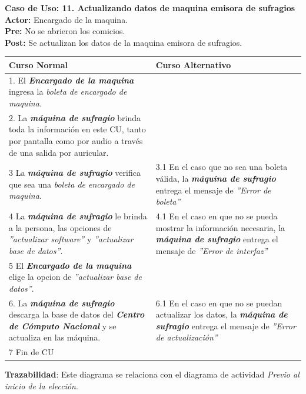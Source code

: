 \documentclass[spanish, 10pt,a4paper]{article}
\numberwithin{equation}{section} %
\begin{document}
\clearpage
\noindent\textbf{Caso de Uso: 11. Actualizando datos de maquina emisora de sufragios}\\
\textbf{Actor: } Encargado de la maquina.\\
\textbf{Pre: } No se abrieron los comicios.\\
\textbf{Post: } Se actualizan los datos de la maquina emisora de sufragios.\\
\begin{table}[H]
  \centering
\bgroup
\def\arraystretch{1.3}
  \begin{tabular}{p{9cm} | p{7cm}}
    \hline
    Curso Normal & Curso Alternativo \\
    \hline
    \hline    
    1. El \textbf{\textit{Encargado de la maquina}} ingresa la \textit{boleta de encargado de maquina}. 
    & \\
    
    \hline
    2. La \textbf{\textit{máquina de sufragio}} brinda toda la información en este CU, tanto por pantalla como por audio a través de una salida por auricular.
    &
    \\
    
    \hline
    3 La \textbf{\textit{máquina de sufragio}} verifica que sea una \textit{boleta de encargado de maquina}.
    & 
    3.1 En el caso que no sea una boleta válida, la \textbf{\textit{máquina de sufragio}} entrega el mensaje de \textit{''Error de boleta''}
    \\
    
    \hline
    4 La \textbf{\textit{máquina de sufragio}} le brinda a la persona, las opciones de \textit{''actualizar software''} y \textit{''actualizar base de datos''}.
    & 
    4.1 En el caso en que no se pueda mostrar la información necesaria, la \textbf{\textit{máquina de sufragio}} entrega el mensaje de \textit{''Error de interfaz''}
    \\
    
    \hline
    5 El \textbf{\textit{Encargado de la maquina}} elige la opcion de \textit{''actualizar base de datos''}.
    & \\
    
    \hline
    6. La \textbf{\textit{máquina de sufragio}} descarga la base de datos del \textbf{\textit{Centro de Cómputo Nacional}} y se actualiza en las máquina.
    &
    6.1 En el caso en que no se puedan actualizar los datos, la \textbf{\textit{máquina de sufragio}} entrega el mensaje de \textit{''Error de actualización''}
    \\
    
    \hline
    7 Fin de CU
    & \\
    \hline
  \end{tabular}
\egroup
\end{table}
\vspace{-10px}
\noindent\textbf{Trazabilidad}: Este diagrama se relaciona con el diagrama de actividad \textit{Previo al inicio de la elección}.\\
\end{document}
